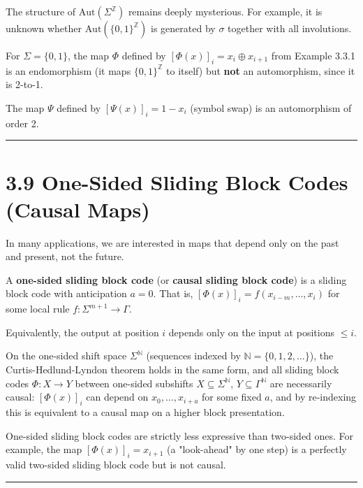 The structure of $\text{Aut}(\Sigma^\mathbb{Z})$ remains deeply mysterious. For example, it is unknown whether $\text{Aut}(\{ 0,1\} ^\mathbb{Z})$ is generated by $\sigma$ together with all involutions.

\begin{example}
For $\Sigma = \{ 0, 1\} $, the map $\Phi$ defined by $[\Phi(x)]_i = x_i \oplus x_{i+1}$ from Example 3.3.1 is an endomorphism (it maps $\{ 0,1\} ^\mathbb{Z}$ to itself) but \textbf{not} an automorphism, since it is 2-to-1.

The map $\Psi$ defined by $[\Psi(x)]_i = 1 - x_i$ (symbol swap) is an automorphism of order 2.

\bigskip\hrule\bigskip
\end{example}

\section{3.9 One-Sided Sliding Block Codes (Causal Maps)}

In many applications, we are interested in maps that depend only on the past and present, not the future.

\begin{definition}
A \textbf{one-sided sliding block code} (or \textbf{causal sliding block code}) is a sliding block code with anticipation $a = 0$. That is, $[\Phi(x)]_i = f(x_{i-m}, \ldots, x_i)$ for some local rule $f: \Sigma^{m+1} \to \Gamma$.

Equivalently, the output at position $i$ depends only on the input at positions $\leq i$.

On the one-sided shift space $\Sigma^\mathbb{N}$ (sequences indexed by $\mathbb{N} = \{ 0, 1, 2, \ldots\} $), the Curtis-Hedlund-Lyndon theorem holds in the same form, and all sliding block codes $\Phi: X \to Y$ between one-sided subshifts $X \subseteq \Sigma^\mathbb{N}$, $Y \subseteq \Gamma^\mathbb{N}$ are necessarily causal: $[\Phi(x)]_i$ can depend on $x_0, \ldots, x_{i+a}$ for some fixed $a$, and by re-indexing this is equivalent to a causal map on a higher block presentation.
\end{definition}

\begin{remark}
One-sided sliding block codes are strictly less expressive than two-sided ones. For example, the map $[\Phi(x)]_i = x_{i+1}$ (a "look-ahead" by one step) is a perfectly valid two-sided sliding block code but is not causal.

\bigskip\hrule\bigskip
\end{remark}

